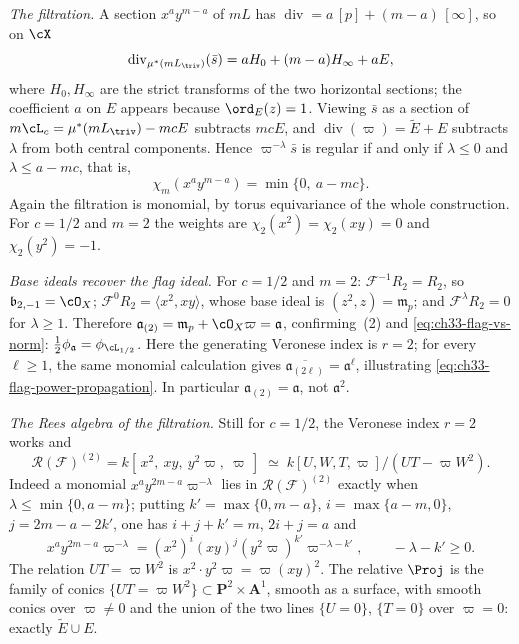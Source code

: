 \begin{example}
\emph{The filtration.}  A section $x^ay^{m-a}$ of $mL$ has
$\operatorname{div}=a\,[p]+(m-a)\,[\infty]$, so on $\cX$
\[
 \operatorname{div}_{\mu^\ast(mL_{\triv})}(\bar s)
 =aH_0+(m-a)H_\infty+aE ,
\]
where $H_0,H_\infty$ are the strict transforms of the two horizontal
sections; the coefficient $a$ on $E$ appears because
$\ord_E(z)=1$.  Viewing $\bar s$ as a section of
$m\cL_c=\mu^\ast(mL_{\triv})-mcE$ subtracts $mcE$, and
$\operatorname{div}(\varpi)=\widetilde E+E$ subtracts $\lambda$ from
both central components.  Hence
$\varpi^{-\lambda}\bar s$ is regular if and only if
$\lambda\leq0$ and $\lambda\leq a-mc$, that is,
\begin{equation}
\label{eq:ch33-dnc-weights}
 \chi_m(x^ay^{m-a})=\min\{0,\ a-mc\} .
\end{equation}
Again the filtration is monomial, by torus equivariance of the whole
construction.  For $c=1/2$ and $m=2$ the weights are
$\chi_2(x^2)=\chi_2(xy)=0$ and $\chi_2(y^2)=-1$.

\emph{Base ideals recover the flag ideal.}  For $c=1/2$ and $m=2$:
$\mathcal F^{-1}R_2=R_2$, so $\mathfrak b_{2,-1}=\cO_X$;
$\mathcal F^0R_2=\langle x^2,xy\rangle$, whose base ideal is
$(z^2,z)=\mathfrak m_p$; and $\mathcal F^\lambda R_2=0$ for
$\lambda\geq1$.  Therefore
$\mathfrak a_{(2)}=\mathfrak m_p+\cO_X\varpi=\mathfrak a$, confirming
\,(2) and
\eqref{eq:ch33-flag-vs-norm}:
$\tfrac12\phi_{\mathfrak a}=\phi_{\cL_{1/2}}$.  Here the generating
Veronese index is $r=2$; for every $\ell\geq1$, the same monomial
calculation gives
$\overline{\mathfrak a_{(2\ell)}}=\mathfrak a^\ell$, illustrating
\eqref{eq:ch33-flag-power-propagation}.  In particular
$\mathfrak a_{(2)}=\mathfrak a$, not $\mathfrak a^2$.

\emph{The Rees algebra of the filtration.}  Still for $c=1/2$, the
Veronese index $r=2$ works and
\begin{equation}
\label{eq:ch33-dnc-filtration-rees}
 \mathcal R(\mathcal F)^{(2)}
 =k[\,x^2,\ xy,\ y^2\varpi,\ \varpi\,]
 \;\simeq\;
 k[U,W,T,\varpi]/(UT-\varpi W^2).
\end{equation}
Indeed a monomial $x^ay^{2m-a}\varpi^{-\lambda}$ lies in
$\mathcal R(\mathcal F)^{(2)}$ exactly when
$\lambda\leq\min\{0,a-m\}$; putting $k'=\max\{0,m-a\}$,
$i=\max\{a-m,0\}$, $j=2m-a-2k'$, one has $i+j+k'=m$, $2i+j=a$ and
\[
 x^ay^{2m-a}\varpi^{-\lambda}
 =(x^2)^{i}(xy)^{j}(y^2\varpi)^{k'}\varpi^{-\lambda-k'},
 \qquad-\lambda-k'\geq0 .
\]
The relation $UT=\varpi W^2$ is $x^2\cdot y^2\varpi=\varpi(xy)^2$.  The
relative $\Proj$ is the family of conics
$\{UT=\varpi W^2\}\subset\mathbf P^2\times\mathbf A^1$, smooth as a
surface, with smooth conics over $\varpi\ne0$ and the union of the two
lines $\{U=0\}$, $\{T=0\}$ over $\varpi=0$: exactly
$\widetilde E\cup E$.


\end{example}

